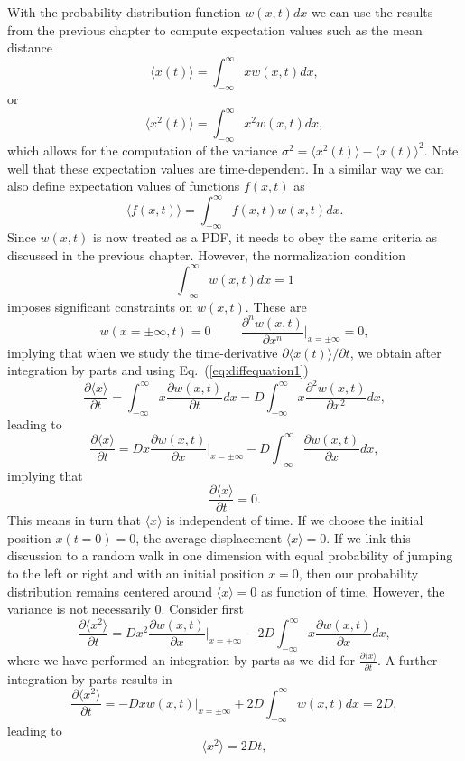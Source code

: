 With the probability distribution function $w(x,t)dx$ we can use the results from the
previous chapter to compute expectation values such as  the mean distance
\[
   \langle x(t)\rangle = \int_{-\infty}^{\infty}xw(x,t)dx,
\]
or
\[
   \langle x^2(t)\rangle = \int_{-\infty}^{\infty}x^2w(x,t)dx, 
\]
which allows for the computation of the variance
$\sigma^2=\langle x^2(t)\rangle-\langle x(t)\rangle^2$. Note well that 
these expectation values are time-dependent. In a similar way we can also
define expectation values of functions $f(x,t)$ as 
\[
   \langle f(x,t)\rangle = \int_{-\infty}^{\infty}f(x,t)w(x,t)dx.
\]
Since $w(x,t)$ is now treated as a PDF, it needs to obey the same criteria
as discussed in the previous chapter. However, the normalization condition
\[
   \int_{-\infty}^{\infty}w(x,t)dx=1
\]
imposes significant constraints on $w(x,t)$. These are
\[
   w(x=\pm \infty,t)=0 \hspace{1cm} 
   \frac{\partial^{n}w(x,t)}{\partial x^n}|_{x=\pm\infty} = 0,
\]
implying that when we study the time-derivative
${\partial\langle x(t)\rangle}/{\partial t}$, we obtain after integration by parts and using 
Eq.~(\ref{eq:diffequation1})  
\[
   \frac{\partial \langle x\rangle}{\partial t} = 
   \int_{-\infty}^{\infty}x\frac{\partial w(x,t)}{\partial t}dx=
   D\int_{-\infty}^{\infty}x\frac{\partial^2w(x,t)}{\partial x^2}dx,
 \]
leading to
\[
   \frac{\partial \langle x\rangle}{\partial t} = 
   Dx\frac{\partial w(x,t)}{\partial x}|_{x=\pm\infty}-
   D\int_{-\infty}^{\infty}\frac{\partial w(x,t)}{\partial x}dx,
 \]
implying that
\[
   \frac{\partial \langle x\rangle}{\partial t} = 0.
 \]
This means in turn that $\langle x\rangle$ is independent of time.
If we choose the initial position $x(t=0)=0$,
the average displacement $\langle x\rangle= 0$.
If we link this discussion to a random walk in one dimension with equal probability
of jumping to the left or right and with an initial position $x=0$, then our probability
distribution remains centered around $\langle x\rangle= 0$ as function of time.
However, the variance is not necessarily 0. Consider first
\[
   \frac{\partial \langle x^2\rangle}{\partial t} = 
   Dx^2\frac{\partial w(x,t)}{\partial x}|_{x=\pm\infty}-
   2D\int_{-\infty}^{\infty}x\frac{\partial w(x,t)}{\partial x}dx,
 \]
where we have performed an integration by parts as we did 
for $\frac{\partial \langle x\rangle}{\partial t}$. A further integration by parts 
results in  
\[
   \frac{\partial \langle x^2\rangle}{\partial t} = 
   -Dxw(x,t)|_{x=\pm\infty}+
   2D\int_{-\infty}^{\infty}w(x,t)dx=2D,
 \]
leading to
\[
   \langle x^2\rangle = 2Dt,
 \]
